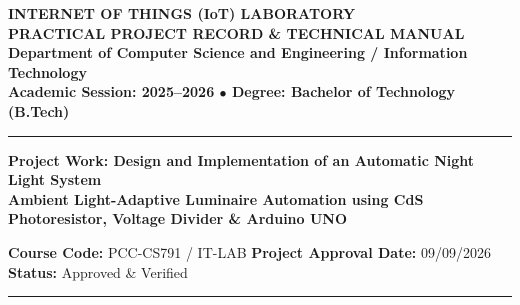 \documentclass[10pt,a4paper]{article}
\begin{document}
\begin{center}
    {\Large\bfseries INTERNET OF THINGS (IoT) LABORATORY}\\[0.05cm]
    {\large\bfseries PRACTICAL PROJECT RECORD \& TECHNICAL MANUAL}\\[0.06cm]
    {\footnotesize\textbf{Department of Computer Science and Engineering / Information Technology}}\\[0.02cm]
    {\scriptsize\textbf{Academic Session: 2025--2026 \quad $\bullet$ \quad Degree: Bachelor of Technology (B.Tech)}}
\end{center}
\vspace{-0.32cm}
\rule{\textwidth}{0.8pt}
\vspace{0.08cm}

\begin{center}
    {\large\bfseries Project Work: Design and Implementation of an Automatic Night Light System}\\[0.04cm]
    {\small\textbf{Ambient Light-Adaptive Luminaire Automation using CdS Photoresistor, Voltage Divider \& Arduino UNO}}
\end{center}
\vspace{-0.18cm}
\noindent\footnotesize\textbf{Course Code:} PCC-CS791 / IT-LAB \hfill \textbf{Project Approval Date:} 09/09/2026 \hfill \textbf{Status:} Approved \& Verified
\vspace{0.02cm}
\hrule
\vspace{0.10cm}
\end{document}
